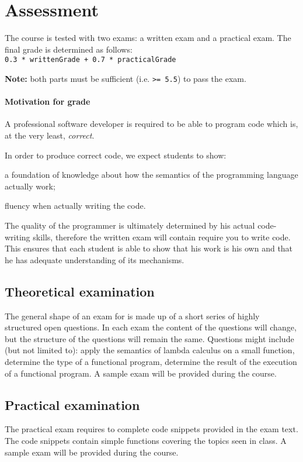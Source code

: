 \section{Assessment}
The course is tested with two exams: a written exam and a practical exam. The final grade is determined as follows: \\

\texttt{0.3 * writtenGrade + 0.7 * practicalGrade}

\textbf{Note:} both parts must be sufficient (i.e. \texttt{>= 5.5}) to pass the exam.

\paragraph*{Motivation for grade}
A professional software developer is required to be able to program code which is, at the very least, \textit{correct}.

In order to produce correct code, we expect students to show:
\begin{inparaenum}
\item a foundation of knowledge about how the semantics of the programming language actually work;
\item fluency when actually writing the code.
\end{inparaenum}

The quality of the programmer is ultimately determined by his actual code-writing skills, therefore the written exam will contain require you to write code. This ensures that each student is able to show that his work is his own and that he has adequate understanding of its mechanisms.



\subsection{Theoretical examination \modulecode}
The general shape of an exam for \texttt{\modulecode} is made up of a short series of highly structured open questions.
In each exam the content of the questions will change, but the structure of the questions will remain the same. Questions might include (but not limited to): apply the semantics of lambda calculus on a small function, determine the type of a functional program, determine the result of the execution of a functional program. A sample exam will be provided during the course.

\subsection{Practical examination \modulecode}
The practical exam requires to complete code snippets provided in the exam text. The code snippets contain simple functions covering the topics seen in class. A sample exam will be provided during the course.

